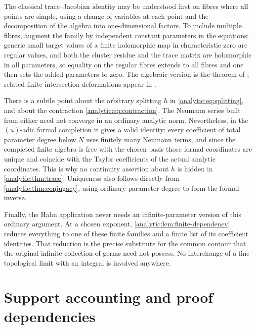 \documentclass[11pt,letterpaper]{article}
\theoremstyle{definition}
\theoremstyle{remark}
\numberwithin{equation}{section}
\begin{document}
The classical trace--Jacobian identity may be understood first on fibres
where all points are simple, using a change of variables at each point and
the decomposition of the algebra into one-dimensional factors. To include
multiple fibres, augment the family by independent constant parameters in
the equations; generic small target values of a finite holomorphic map in
characteristic zero are regular values, and both the cluster residue and the
trace matrix are holomorphic in all parameters, so equality on the regular
fibres extends to all fibres and one then sets the added parameters to
zero. The algebraic version is the theorem of \cite{SS}; related finite
intersection deformations appear in \cite{KW}.

There is a subtle point about the arbitrary splitting $h$ in
\eqref{analytic:eq:splitting}, and about the contraction
\eqref{analytic:eq:contraction}. The Neumann series built from either need
not converge in an ordinary analytic norm. Nevertheless, in the $(u)$-adic
formal completion it gives a valid identity: every coefficient of total
parameter degree below $N$ uses finitely many Neumann terms, and since the
completed finite algebra is free with the chosen basis those formal
coordinates are unique and coincide with the Taylor coefficients of the
actual analytic coordinates. This is why no continuity assertion about $h$
is hidden in \cref{analytic:thm:trace}. Uniqueness also follows directly
from \cref{analytic:thm:conjugacy}, using ordinary parameter degree to form
the formal inverse.

Finally, the Hahn application never needs an infinite-parameter version of
this ordinary argument. At a chosen exponent,
\cref{analytic:lem:finite-dependency} reduces everything to one of these
finite families and a finite list of its coefficient identities. That
reduction is the precise substitute for the common contour that the original
infinite collection of germs need not possess. No interchange of a
fine-topological limit with an integral is involved anywhere.

\section{Support accounting and proof dependencies}
\label{analytic:app:support}
\end{document}

